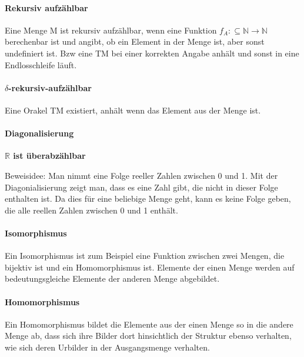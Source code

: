 \documentclass[ngerman]{scrartcl}
\begin{document}
\paragraph{Rekursiv aufzählbar}
Eine Menge M ist rekursiv aufzählbar, wenn eine Funktion $ f_A : \subseteq \mathbb{N} \rightarrow \mathbb{N} $ berechenbar ist und angibt, ob ein Element in der Menge ist, aber sonst undefiniert ist. Bzw eine TM bei einer korrekten Angabe anhält und sonst in eine Endlosschleife läuft.

\paragraph{$ \delta $-rekursiv-aufzählbar} Eine Orakel TM existiert, anhält wenn das Element aus der Menge ist.

\paragraph{Diagonalisierung}
\textbf{$ \mathbb{R} $ ist überabzählbar}

Beweisidee: Man nimmt eine Folge reeller Zahlen zwischen 0 und 1. Mit der Diagonialisierung zeigt man, dass es eine Zahl gibt, die nicht in dieser Folge enthalten ist. Da dies für eine beliebige Menge geht, kann es keine Folge geben, die alle reellen Zahlen zwischen 0 und 1 enthält.

\paragraph{Isomorphismus}
Ein Isomorphismus ist zum Beispiel eine Funktion zwischen zwei Mengen, die bijektiv ist und ein Homomorphismus ist. Elemente der einen Menge werden auf bedeutungsgleiche Elemente der anderen Menge abgebildet.

\paragraph{Homomorphismus}
Ein Homomorphismus bildet die Elemente aus der einen Menge so in die andere Menge ab, dass sich ihre Bilder dort hinsichtlich der Struktur ebenso verhalten, wie sich deren Urbilder in der Ausgangsmenge verhalten.
\end{document}
